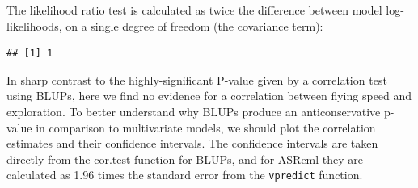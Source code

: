 \documentclass[
  12pt,
]{book}
\newenvironment{Shaded}{\begin{snugshade}}{\end{snugshade}}
\newcommand{\AttributeTok}[1]{\textcolor[rgb]{0.77,0.63,0.00}{#1}}
\newcommand{\ConstantTok}[1]{\textcolor[rgb]{0.00,0.00,0.00}{#1}}
\newcommand{\DecValTok}[1]{\textcolor[rgb]{0.00,0.00,0.81}{#1}}
\newcommand{\FunctionTok}[1]{\textcolor[rgb]{0.00,0.00,0.00}{#1}}
\newcommand{\NormalTok}[1]{#1}
\newcommand{\OtherTok}[1]{\textcolor[rgb]{0.56,0.35,0.01}{#1}}
\newcommand{\SpecialCharTok}[1]{\textcolor[rgb]{0.00,0.00,0.00}{#1}}
\begin{document}
The likelihood ratio test is calculated as twice the difference between model log-likelihoods, on a single degree of freedom (the covariance term):

\begin{Shaded}
\end{Shaded}

\begin{verbatim}
## [1] 1
\end{verbatim}

In sharp contrast to the highly-significant P-value given by a correlation test using BLUPs, here we find no evidence for a correlation between flying speed and exploration.
To better understand why BLUPs produce an anticonservative p-value in comparison to multivariate models, we should plot the correlation estimates and their confidence intervals. The confidence intervals are taken directly from the cor.test function for BLUPs, and for ASReml they are calculated as 1.96 times the standard error from the \texttt{vpredict} function.
\end{document}

